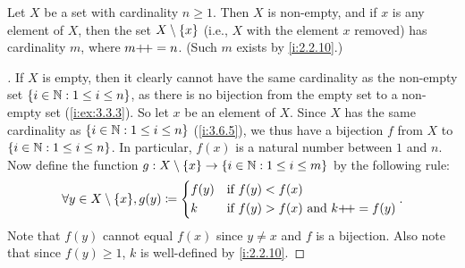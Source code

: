 \begin{lem}\label{i:3.6.9}
  Let \(X\) be a set with cardinality \(n \geq 1\).
  Then \(X\) is non-empty, and if \(x\) is any element of \(X\), then the set \(X \setminus \left\lbrace x\right\rbrace\) (i.e., \(X\) with the element \(x\) removed) has cardinality \(m\), where \(m{+}\!{+} = n\).
  (Such \(m\) exists by \cref{i:2.2.10}.)
\end{lem}

\begin{proof}[]
  If \(X\) is empty, then it clearly cannot have the same cardinality as the non-empty set \(\left\lbrace i \in \mathbb{N} : 1 \leq i \leq n\right\rbrace\), as there is no bijection from the empty set to a non-empty set (\cref{i:ex:3.3.3}).
  So let \(x\) be an element of \(X\).
  Since \(X\) has the same cardinality as \(\left\lbrace i \in \mathbb{N} : 1 \leq i \leq n\right\rbrace\) (\cref{i:3.6.5}), we thus have a bijection \(f\) from \(X\) to \(\left\lbrace i \in \mathbb{N} : 1 \leq i \leq n\right\rbrace\).
  In particular, \(f(x)\) is a natural number between \(1\) and \(n\).
  Now define the function \(g : X \setminus \left\lbrace x\right\rbrace \to \left\lbrace i \in \mathbb{N} : 1 \leq i \leq m\right\rbrace\) by the following rule:
  \[
    \forall y \in X \setminus \set{x}, g(y) \coloneqq \begin{dcases}
      f(y) & \text{if } f(y) < f(x)                          \\
      k    & \text{if } f(y) > f(x) \text{ and } k\pp = f(y)
    \end{dcases}.
  \]
  Note that \(f(y)\) cannot equal \(f(x)\) since \(y \neq x\) and \(f\) is a bijection.
  Also note that since \(f(y) \geq 1\), \(k\) is well-defined by \cref{i:2.2.10}.


\end{proof}
